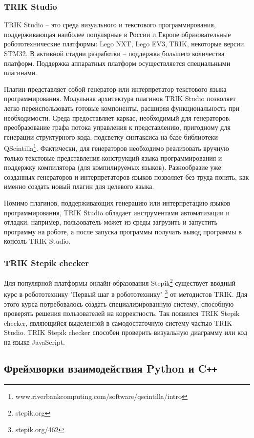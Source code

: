 \documentclass[14pt]{matmex-diploma-custom}
\begin{document}
\subsubsection{TRIK Studio}
TRIK Studio -- это среда визуального и текстового программирования, поддерживающая наиболее популярные в России и Европе образовательные робототехнические платформы: Lego NXT, Lego EV3, TRIK, некоторые версии STM32. В активной стадии разработки -- поддержка большего количества платформ. Поддержка аппаратных платформ осуществляется специальными плагинами. 

Плагин представляет собой генератор или интерпретатор текстового языка программирования. Модульная архитектура плагинов TRIK Studio позволяет легко переиспользовать готовые компоненты, расширяя функциональность при необходимости. Среда предоставляет каркас, необходимый для генераторов: преобразование графа потока управления к представлению, пригодному для генерации структурного кода, подсветку синтаксиса на базе библиотеки QScintilla\footnote{www.riverbankcomputing.com/software/qscintilla/intro}. Фактически, для генераторов необходимо реализовать вручную только текстовые представления конструкций языка программирования и поддержку компилятора (для компилируемых языков). Разнообразие уже созданных генераторов и интерпретаторов языков позволяет без труда понять, как именно создать новый плагин для целевого языка.

Помимо плагинов, поддерживающих генерацию или интерпретацию языков программирования, TRIK Studio обладает инструментами автоматизации и отладки: например, пользователь может из среды загрузить и запустить программу на роботе, а после запуска программы получать вывод программы в консоль TRIK Studio.

\subsubsection{TRIK Stepik checker}
Для популярной платформы онлайн-образования Stepik\footnote{stepik.org} существует вводный курс в робототехнику "Первый шаг в робототехнику" \footnote{stepik.org/462} от методистов TRIK. Для этого курса потребовалось создать специализированную систему, способную проверять решения пользователей на корректность. Так появился TRIK Stepik checker, являющийся выделенной в самодостаточную систему частью TRIK Studio. TRIK Stepik checker способен проверить визуальную диаграмму или код на языке JavaScript.

\subsection{Фреймворки взаимодействия Python и C\texttt{++}}
\end{document}
